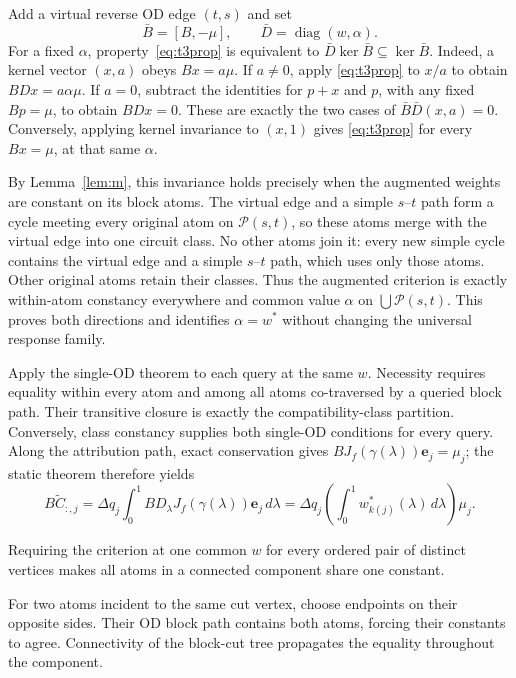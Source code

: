 \begin{pf}
Add a virtual reverse OD edge $(t,s)$ and set
\[
\bar B=[B,-\mu],\qquad \bar D=\operatorname{diag}(w,\alpha).
\]
For a fixed $\alpha$, property~\eqref{eq:t3prop} is equivalent to
$\bar D\ker\bar B\subseteq\ker\bar B$.
Indeed, a kernel vector $(x,a)$ obeys $Bx=a\mu$. If $a\ne0$,
apply \eqref{eq:t3prop} to $x/a$ to obtain $BDx=a\alpha\mu$.
If $a=0$, subtract the identities for $p+x$ and $p$, with any fixed
$Bp=\mu$, to obtain $BDx=0$. These are exactly the two cases of
$\bar B\bar D(x,a)=0$. Conversely, applying kernel invariance to
$(x,1)$ gives \eqref{eq:t3prop} for every $Bx=\mu$, at that same $\alpha$.

By Lemma~\ref{lem:m}, this invariance holds precisely when the augmented
weights are constant on its block atoms. The virtual edge and a simple
$s$--$t$ path form a cycle meeting every original atom on
$\mathcal P(s,t)$, so these atoms merge with the virtual edge into one
circuit class. No other atoms join it: every new simple cycle contains
the virtual edge and a simple $s$--$t$ path, which uses only those
atoms. Other original atoms retain their classes. Thus the augmented
criterion is exactly within-atom constancy everywhere and common value
$\alpha$ on $\bigcup\mathcal P(s,t)$. This proves both directions and
identifies $\alpha=w^*$ without changing the universal response family.
\end{pf}

\begin{pf}
Apply the single-OD theorem to each query at the same $w$. Necessity
requires equality within every atom and among all atoms co-traversed
by a queried block path. Their transitive closure is exactly the
compatibility-class partition. Conversely, class constancy supplies
both single-OD conditions for every query. Along the attribution
path, exact conservation gives $BJ_f(\gamma(\lambda))\mathbf e_j=\mu_j$;
the static theorem therefore yields
\[
B\widetilde C_{:,j}=\Delta q_j\int_0^1
BD_\lambda J_f(\gamma(\lambda))\mathbf e_j\,d\lambda
=\Delta q_j\left(\int_0^1w^*_{k(j)}(\lambda)\,d\lambda\right)\mu_j.
\]
\end{pf}

\begin{corollary}\label{cor:allod}
Requiring the criterion at one common $w$ for every ordered pair of
distinct vertices makes all atoms in a connected component share one
constant.
\end{corollary}
\begin{pf}
For two atoms incident to the same cut vertex, choose endpoints on
their opposite sides. Their OD block path contains both atoms, forcing
their constants to agree. Connectivity of the block-cut tree propagates
the equality throughout the component.
\end{pf}

